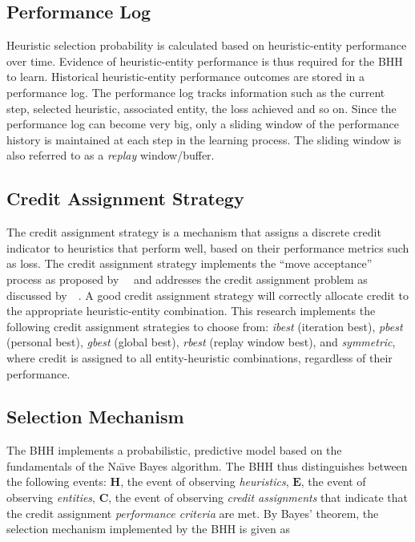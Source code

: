 \subsection{Performance Log}\label{sec:bhh:performance_log}

Heuristic selection probability is calculated based on heuristic-entity performance over time. Evidence of heuristic-entity performance is thus required for the \acs{BHH} to learn. Historical heuristic-entity performance outcomes are stored in a performance log. The performance log tracks information such as the current step, selected heuristic, associated entity, the loss achieved and so on. Since the performance log can become very big, only a sliding window of the performance history is maintained at each step in the learning process. The sliding window is also referred to as a \textit{replay} window/buffer.


\subsection{Credit Assignment Strategy}
\label{sec:bhh:credit_assignment_strategy}

The credit assignment strategy is a mechanism that assigns a discrete credit indicator to heuristics that perform well, based on their performance metrics such as loss. The credit assignment strategy implements the ``move acceptance'' process as proposed by~\citeauthor{ref:ozcan:2006}~\cite{ref:ozcan:2006,ref:ozcan:2008} and addresses the credit assignment problem as discussed by~\citeauthor{ref:burke:2010}~\cite{ref:burke:2010}. A good credit assignment strategy will correctly allocate credit to the appropriate heuristic-entity combination. This research  implements the following credit assignment strategies to choose from: \textit{ibest} (iteration best), \textit{pbest} (personal best), \textit{gbest} (global best), \textit{rbest} (replay window best), and \textit{symmetric}, where credit is assigned to all entity-heuristic combinations, regardless of their performance.

\subsection{Selection Mechanism}\label{sec:bhh:selection_mechanism}

The \acs{BHH} implements a probabilistic, predictive model based on the fundamentals of the Na\"{\i}ve Bayes algorithm. The \acs{BHH} thus distinguishes between the following events: \textbf{$\boldsymbol{H}$}, the event of observing \textit{heuristics}, \textbf{$\boldsymbol{E}$}, the event of observing \textit{entities}, \textbf{$\boldsymbol{C}$}, the event of observing \textit{credit assignments} that indicate that the credit assignment \textit{performance criteria} are met. By Bayes' theorem, the selection mechanism implemented by the \acs{BHH} is given as


